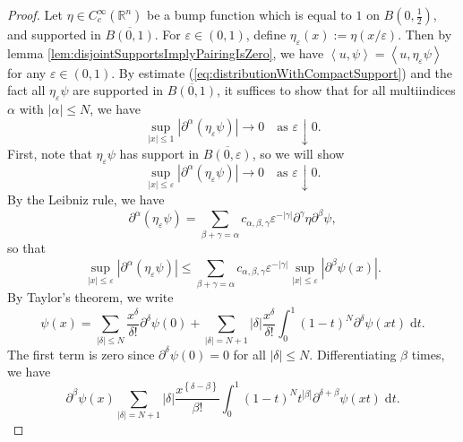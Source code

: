 \documentclass{book}
\newcommand{\bbR}{\mathbb{R}}
\renewcommand{\d}{\mathrm{d}}
\renewcommand{\epsilon}{\varepsilon}
\newcommand{\abs}[1]{\left\lvert {#1} \right\rvert}
\newcommand{\set}[1]{\left\{ {#1} \right\}}
\newcommand{\angles}[1]{\left\langle {#1} \right\rangle}
\theoremstyle{definition}
\theoremstyle{remark}
\numberwithin{equation}{chapter}
\begin{document}
\begin{proof}
    Let $\eta \in C_c^\infty(\bbR^n)$ be a bump function which is equal to $1$ on $B(0,\frac{1}{2})$, and supported in $\overline{B(0,1)}$. For $\epsilon \in (0,1)$, define $\eta_\epsilon(x) := \eta(x/\epsilon)$. Then by lemma \ref{lem:disjointSupportsImplyPairingIsZero}, we have $\angles{u,\psi} = \angles{u,\eta_\epsilon \psi}$ for any $\epsilon \in (0,1)$. By estimate (\ref{eq:distributionWithCompactSupport}) and the fact all $\eta_\epsilon \psi$ are supported in $\overline{B(0,1)}$, it suffices to show that for all multiindices $\alpha$ with $\abs{\alpha} \leq N$, we have 
    \begin{equation}
        \sup_{\abs{x} \leq 1} \abs{\partial^\alpha(\eta_\epsilon \psi)} \rightarrow 0 \quad \text{as } \epsilon \downarrow 0.
    \end{equation}
    First, note that $\eta_\epsilon \psi$ has support in $\overline{B(0,\epsilon)}$, so we will show 
    \begin{equation}
        \sup_{\abs{x} \leq \epsilon} \abs{\partial^\alpha(\eta_\epsilon \psi)} \rightarrow 0 \quad \text{as } \epsilon \downarrow 0.
    \end{equation}
    By the Leibniz rule, we have 
    \begin{equation}
        \partial^\alpha(\eta_\epsilon \psi) = \sum_{\beta + \gamma = \alpha} c_{\alpha,\beta,\gamma} \epsilon^{-\abs{\gamma}} \partial^\gamma \eta \partial^\beta \psi,
    \end{equation}
    so that 
    \begin{equation} \label{eq:estimateOnEtaEpsilonPsi}
        \sup_{\abs{x} \leq \epsilon} \abs{\partial^\alpha(\eta_\epsilon \psi)} 
        \leq \sum_{\beta + \gamma = \alpha} c_{\alpha,\beta,\gamma} \epsilon^{-\abs{\gamma}} \sup_{\abs{x} \leq \epsilon} \abs{\partial^\beta \psi(x)}.
    \end{equation}
    By Taylor's theorem, we write 
    \begin{equation}
        \psi(x) = \sum_{\abs{\delta} \leq N} \frac{x^\delta}{\delta!} \partial^\delta \psi(0) + \sum_{\abs{\delta} = N+1} \abs{\delta} \frac{x^\delta}{\delta!} \int_0^1 (1-t)^N \partial^\delta \psi(xt) \; \d t.
    \end{equation}
    The first term is zero since $\partial^\delta \psi(0) = 0$ for all $\abs{\delta} \leq N$. Differentiating $\beta$ times, we have 
    \begin{equation}
        \partial^\beta \psi(x) \sum_{\abs{\delta} = N+1} \abs{\delta} \frac{x^{\set{\delta - \beta}}}{\beta!} \int_0^1 (1-t)^N t^{\abs{\beta}} \partial^{\delta + \beta} \psi(xt) \; \d t.

\end{equation}
\end{proof}
\end{document}
